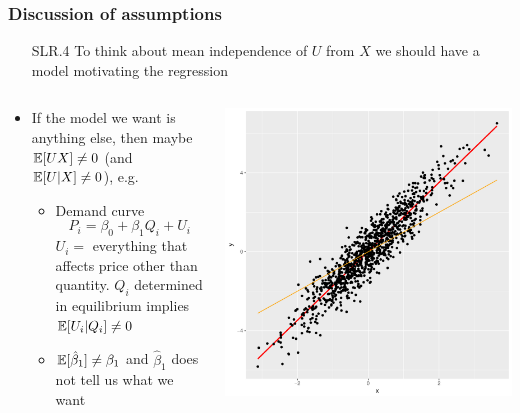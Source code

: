 \begin{frame}[allowframebreaks]
\begin{columns}[c]
\begin{column}{.48\textwidth}
    \end{column}
  \end{columns}
\end{frame}

\begin{frame}[allowframebreaks]
  \frametitle{Discussion of assumptions}
  \begin{itemize}
  \item[SLR.4] To think about mean independence of $U$ from $X$
    we should have a model motivating the regression
  \end{itemize}
  \begin{columns}[c] %
    \begin{column}{.48\textwidth}
      \begin{itemize}
      \item If the model we want is anything else, then maybe
        $\mathbb{E}[UX] \neq 0$ (and $\mathbb{E}[U | X] \neq 0$), e.g.\ 
        \begin{itemize}
        \item Demand curve 
          \[ P_i = \beta_0 + \beta_1 Q_i + U_i \]
          $U_i = $ everything that affects price other than
          quantity. $Q_i$ determined in equilibrium implies
          $\mathbb{E}[U_i | Q_i] \neq 0$ 
        \item $\mathbb{E}[\hat{\beta}_1] \neq \beta_1$ and $\hat{\beta}_1$ does
          not tell us what we want
        \end{itemize}
      \end{itemize}
    \end{column}
    \begin{column}{.48\textwidth}
      \includegraphics[width=\textwidth]{endogenous} \\

\end{column}
\end{columns}
\end{frame}
